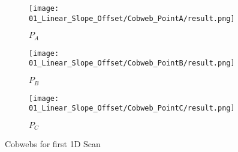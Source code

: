 \begin{figure}
    \centering
    \begin{subfigure}{0.3\textwidth}
        \centering
        \texttt{[image: 01\_Linear\_Slope\_Offset/Cobweb\_PointA/result.png]}
        \caption{$P_A$}
        \label{fig:pcw.lin.CobwebA}
    \end{subfigure}
    \begin{subfigure}{0.3\textwidth}
        \centering
        \texttt{[image: 01\_Linear\_Slope\_Offset/Cobweb\_PointB/result.png]}
        \caption{$P_B$}
        \label{fig:pcw.lin.CobwebB}
    \end{subfigure}
    \begin{subfigure}{0.3\textwidth}
        \centering
        \texttt{[image: 01\_Linear\_Slope\_Offset/Cobweb\_PointC/result.png]}
        \caption{$P_C$}
        \label{fig:pcw.lin.CobwebC}
    \end{subfigure}
    \caption{Cobwebs for first 1D Scan}
    \label{fig:pcw.lin.CobwebA-C}
\end{figure}
